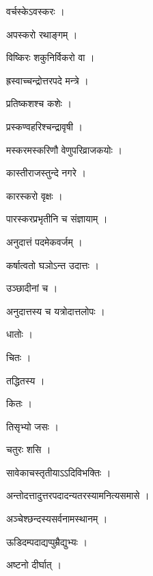 \documentclass[10pt, openany]{book}
\begin{document}
\noindent वर्चस्केऽवस्करः ।

\noindent अपस्करो रथाङ्गम् ।

\noindent विष्किरः शकुनिर्विकरो वा ।

\noindent ह्रस्वाच्चन्द्रोत्तरपदे मन्त्रे ।

\noindent प्रतिष्कशश्च कशेः ।

\noindent प्रस्कण्वहरिश्चन्द्रावृषी ।

\noindent मस्करमस्करिणौ वेणुपरिव्राजकयोः ।

\noindent कास्तीराजस्तुन्दे नगरे ।

\noindent कारस्करो वृक्षः ।

\noindent पारस्करप्रभृतीनि च संज्ञायाम् ।

\noindent अनुदात्तं पदमेकवर्जम् ।

\noindent कर्षात्वतो घञोऽन्त उदात्तः ।

\noindent उञ्छादीनां च ।

\noindent अनुदात्तस्य च यत्रोदात्तलोपः ।

\noindent धातोः ।

\noindent चितः ।

\noindent तद्धितस्य ।

\noindent कितः ।

\noindent तिसृभ्यो जसः ।

\noindent चतुरः शसि ।

\noindent सावेकाचस्तृतीयाऽऽदिविभक्तिः ।

\noindent अन्तोदत्तादुत्तरपदादन्यतरस्यामनित्यसमासे ।

\noindent अञ्चेश्छन्दस्यसर्वनामस्थानम् ।

\noindent ऊडिदम्पदाद्यप्पुम्रैद्युभ्यः ।

\noindent अष्टनो दीर्घात् ।
\end{document}
